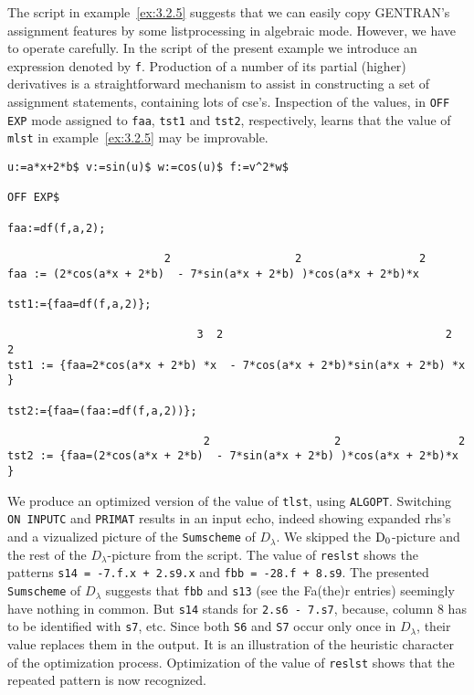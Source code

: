 The script in example~\ref{ex:3.2.5} suggests that we can easily copy GENTRAN's
assignment features by some listprocessing in algebraic mode. However, we 
have to operate carefully. In the script of the present example we introduce an
expression denoted by {\tt f}. Production of a number of its partial (higher)
derivatives is a straightforward mechanism to assist in constructing a set
of assignment statements, containing lots of cse's. Inspection of the values,
in {\tt OFF EXP} mode assigned to {\tt faa}, {\tt tst1} and {\tt tst2}, 
respectively, learns that the value of {\tt mlst} in example~\ref{ex:3.2.5}
may be improvable.
{\small
\begin{verbatim}
u:=a*x+2*b$ v:=sin(u)$ w:=cos(u)$ f:=v^2*w$

OFF EXP$

faa:=df(f,a,2);

                        2                   2                  2
faa := (2*cos(a*x + 2*b)  - 7*sin(a*x + 2*b) )*cos(a*x + 2*b)*x

tst1:={faa=df(f,a,2)};

                             3  2                                  2  2
tst1 := {faa=2*cos(a*x + 2*b) *x  - 7*cos(a*x + 2*b)*sin(a*x + 2*b) *x }

tst2:={faa=(faa:=df(f,a,2))};

                              2                   2                  2
tst2 := {faa=(2*cos(a*x + 2*b)  - 7*sin(a*x + 2*b) )*cos(a*x + 2*b)*x }
\end{verbatim}}
We produce an optimized version of the value of {\tt tlst}, using {\tt ALGOPT}.
Switching {\tt ON INPUTC} and {\tt PRIMAT} results in an input echo, indeed
showing expanded rhs's and a vizualized picture of the \verb+Sumscheme+ of
$D_{\lambda}$. We skipped the ${\rm D_0}$-picture and the rest of the 
$D_{\lambda}$-picture from the script. The value of {\tt reslst} shows the
patterns {\tt s14 = -7.f.x + 2.s9.x} and {\tt fbb = -28.f + 8.s9}. 
The presented \verb+Sumscheme+ of $D_{\lambda}$ suggests that {\tt fbb} and 
{\tt s13} (see the Fa(the)r entries) seemingly have
nothing in common. But {\tt s14} stands for {\tt 2.s6 - 7.s7}, because,
column 8 has to be identified with {\tt s7}, etc. Since both {\tt S6} and
{\tt S7} occur only once in $D_{\lambda}$, their value replaces them in the 
output.
It is an illustration of the heuristic character of the optimization process.
Optimization of the value of {\tt reslst} shows that the repeated pattern 
is now recognized.
